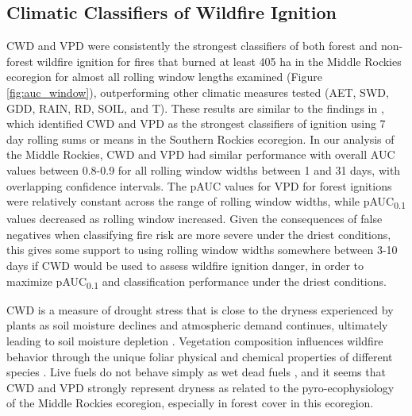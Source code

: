 \documentclass[11p]{article}
\newcommand{\pauc}[1]{pAUC\textsubscript{#1}}
\begin{document}
\subsection{Climatic Classifiers of Wildfire Ignition}
CWD and VPD were consistently the strongest classifiers of both forest and non-forest wildfire ignition for fires that burned at least 405 ha in the Middle Rockies ecoregion for almost all rolling window lengths examined (Figure \ref{fig:auc_window}), outperforming other climatic measures tested (AET, SWD, GDD, RAIN, RD, SOIL, and T). These results are similar to the findings in , which identified CWD and VPD as the strongest classifiers of ignition using 7 day rolling sums or means in the Southern Rockies ecoregion. In our analysis of the Middle Rockies, CWD and VPD had similar performance with overall AUC values between 0.8-0.9 for all rolling window widths between 1 and 31 days, with overlapping confidence intervals. The pAUC values for VPD for forest ignitions were relatively constant across the range of rolling window widths, while \pauc{0.1} values decreased as rolling window increased. Given the consequences of false negatives when classifying fire risk are more severe under the driest conditions, this gives some support to using rolling window widths somewhere between 3-10 days if CWD would be used to assess wildfire ignition danger, in order to maximize \pauc{0.1} and classification performance under the driest conditions.

CWD is a measure of drought stress that is close to the dryness experienced by plants as soil moisture declines and atmospheric demand continues, ultimately leading to soil moisture depletion \citep{stephensonActualEvapotranspirationDeficit1998}. Vegetation composition influences wildfire behavior through the unique foliar physical and chemical properties of different species \citep{mattjollySeasonalVariationsRed2016}. Live fuels do not behave simply as wet dead fuels \citep{jollyPyroEcophysiologyShiftingParadigm2018}, and it seems that CWD and VPD strongly represent dryness as related to the pyro-ecophysiology of the Middle Rockies ecoregion, especially in forest cover in this ecoregion. 
\end{document}
